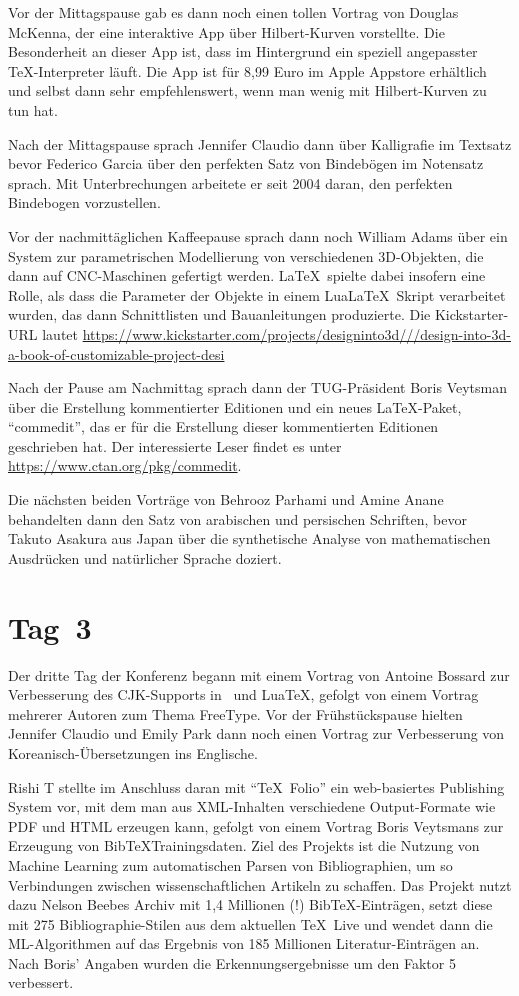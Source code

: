 \documentclass[ngerman]{dtk}
\begin{document}
Vor der Mittagspause gab es dann noch einen tollen Vortrag von Douglas McKenna, der 
eine interaktive App über Hilbert-Kurven vorstellte. Die Besonderheit an dieser App ist, dass im Hintergrund ein speziell angepasster \TeX-Interpreter läuft. Die App ist für 8,99 Euro im Apple Appstore erhältlich und selbst dann sehr empfehlenswert, wenn man wenig mit Hilbert-Kurven zu tun hat.

Nach der Mittagspause sprach Jennifer Claudio dann über Kalligrafie im Textsatz bevor Federico Garcia über den perfekten Satz von Bindebögen im Notensatz sprach. Mit Unterbrechungen arbeitete er seit 2004 daran, den perfekten Bindebogen vorzustellen.

Vor der nachmittäglichen Kaffeepause sprach dann noch William Adams über ein System zur parametrischen Modellierung von verschiedenen 3D-Objekten, die dann auf CNC-Maschinen gefertigt werden. \LaTeX\ spielte dabei insofern eine Rolle, als dass die Parameter der Objekte in einem Lua\LaTeX\ Skript verarbeitet wurden,  das dann Schnittlisten und Bauanleitungen produzierte. Die Kickstarter-URL lautet \url{https://www.kickstarter.com/projects/designinto3d///design-into-3d-a-book-of-customizable-project-desi}

Nach der Pause am Nachmittag sprach dann der TUG-Präsident Boris Veytsman über die Erstellung kommentierter Editionen und ein neues \LaTeX-Paket, \enquote{commedit}, das er für die Erstellung dieser kommentierten Editionen geschrieben hat. Der interessierte Leser findet es unter \url{https://www.ctan.org/pkg/commedit}.

Die nächsten beiden Vorträge von Behrooz Parhami und Amine Anane behandelten dann den Satz von arabischen und persischen Schriften, bevor Takuto Asakura aus Japan über die synthetische Analyse von mathematischen Ausdrücken und natürlicher Sprache doziert.

\section{Tag~3}

Der dritte Tag der Konferenz begann mit einem Vortrag von Antoine Bossard zur Verbesserung des CJK-Supports in \XeTeX\ und Lua\TeX, gefolgt von einem Vortrag mehrerer Autoren zum Thema FreeType. Vor der Frühstückspause hielten Jennifer Claudio und Emily Park dann noch einen Vortrag zur Verbesserung von Koreanisch-Übersetzungen ins Englische.

Rishi T stellte im Anschluss daran mit \enquote{\TeX\ Folio} ein web-basiertes Publishing System vor, mit dem man aus XML-Inhalten verschiedene Output-Formate wie PDF und HTML erzeugen kann, gefolgt von einem Vortrag Boris Veytsmans zur Erzeugung von Bib\TeX\-Trainingsdaten. Ziel des Projekts ist die Nutzung von Machine Learning zum automatischen Parsen von Bibliographien, um so Verbindungen zwischen wissenschaftlichen Artikeln zu schaffen. Das Projekt nutzt dazu Nelson Beebes Archiv mit 1,4 Millionen (!) BibTeX-Einträgen, setzt diese mit 275 Bibliographie-Stilen aus dem aktuellen \TeX~Live und wendet dann die ML-Algorithmen auf das Ergebnis von 185 Millionen Literatur-Einträgen an. Nach Boris' Angaben wurden die Erkennungsergebnisse um den Faktor 5 verbessert.
\end{document}
